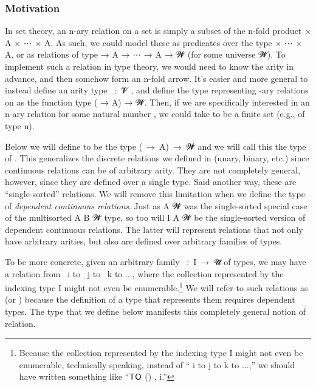 \subsubsection{Motivation}\label{sec:motivation-1}
In set theory, an \ab n-ary relation on a set  is simply a subset of the \ab n-fold product  \ad × \ab A \ad × \as ⋯ \ad × \ab A. As such, we could model these as predicates over the type  \ad × \as ⋯ \ad × \ab A, or as relations of type  \as → \ab A \as → \as ⋯ \as → \ab A \as → \ab 𝓦\af ̇ (for some universe \ab 𝓦). To implement such a relation in type theory, we would need to know the arity in advance, and then somehow form an \ab n-fold arrow. It's easier and more general to instead define an arity type ~\as :~\ab 𝓥\af ̇ , and define the type representing -ary relations on  as the function type ( \as → \ab A) \as → \ab 𝓦\af ̇. Then, if we are specifically interested in an \ab n-ary relation for some natural number , we could take  to be a finite set (e.g., of type  n).

Below we will define  to be the type (~\as →~\ab A)~\as →~\ab 𝓦\af ̇ and we will call this the type of . This generalizes the discrete relations we defined in  (unary, binary, etc.) since continuous relations can be of arbitrary arity.  They are not completely general, however, since they are defined over a single type. Said another way, these are ``single-sorted'' relations. We will remove this limitation when we define the type of \emph{dependent continuous relations}. Just as  \ab A \ab 𝓦 was the single-sorted special case of the multisorted  \ab A \ab B \ab 𝓦 type, so too will  \ab I \ab A \ab 𝓦 be the single-sorted version of dependent continuous relations. The latter will represent relations that not only have arbitrary arities, but also are defined over arbitrary families of types.

To be more concrete, given an arbitrary family ~\as :~\ab I~\as →~\ab 𝓤\af ̇ of types, we may have a relation from ~\ab i to ~\ab j to ~\ab k to $\ldots$, where the collection represented by the indexing type \ab I might not even be enumerable.\footnote{Because the collection represented by the indexing type \ab I might not even be enumerable, technically speaking, instead of `` \ab i to  \ab j to  \ab k to $\ldots$,'' we should have written something like ``$\mathsf{\af{TO}}$ () ,  \ab i.''}
We will refer to such relations as  (or ) because the definition of a type that represents them requires dependent types. The  type that we define below manifests this completely general notion of relation.

